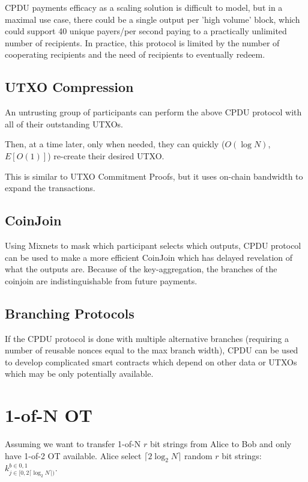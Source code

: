 \documentclass{article}
\begin{document}
CPDU payments efficacy as a scaling solution is difficult to model, but in a maximal use case, there could be a single output per 'high volume' block, which could support 40 unique payers/per second paying to a practically unlimited number of recipients. In practice, this protocol is limited by the number of cooperating recipients and the need of recipients to eventually redeem.


\subsection{UTXO Compression}

An untrusting group of participants can perform the above CPDU protocol with all of their outstanding UTXOs.

Then, at a time later, only when needed, they can quickly ($O(\log N)$, $E[O(1)]$) re-create their desired UTXO.

This is similar to UTXO Commitment Proofs, but it uses on-chain bandwidth to expand the transactions.

\subsection{CoinJoin}

Using Mixnets to mask which participant selects which outputs, CPDU protocol can be used to make a more efficient CoinJoin which has delayed revelation of what the outputs are. Because of the key-aggregation, the branches of the coinjoin are indistinguishable from future payments.

\subsection{Branching Protocols}

If the CPDU protocol is done with multiple alternative branches (requiring a number of reusable nonces equal to the max branch width), CPDU can be used to develop complicated smart contracts which depend on other data or UTXOs which may be only potentially available.

\appendix
\section{1-of-N OT}\label{app:A}
Assuming we want to transfer 1-of-N $r$ bit strings from Alice to Bob and only have 1-of-2 OT available. Alice select $\lceil 2 \log_2 N \rceil $ random $r$ bit strings:
 $k^{b \in {0,1}}_{j\in [0,2 \lceil \log_2 N \rceil)}$.
\end{document}
